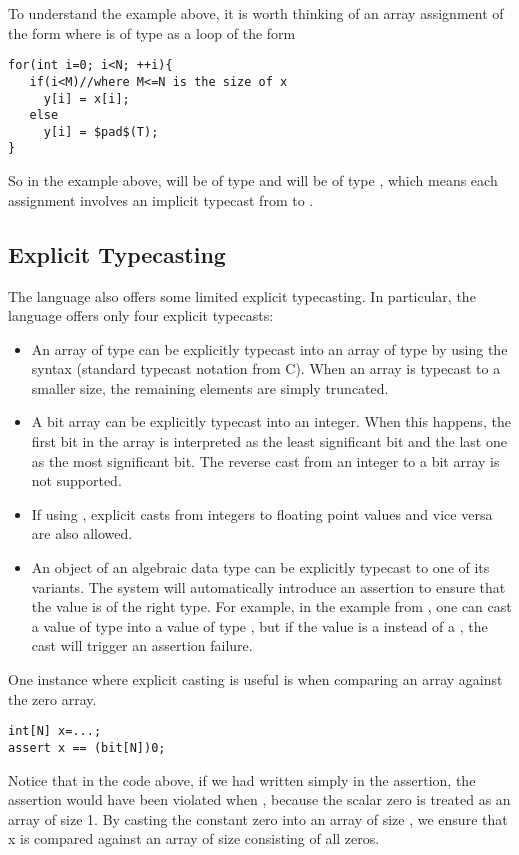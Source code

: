 To understand the example above, it is worth thinking of an array assignment of the form  where  is of type  as a loop of the form 
\begin{lstlisting}
for(int i=0; i<N; ++i){
   if(i<M)//where M<=N is the size of x
     y[i] = x[i];
   else
     y[i] = $pad$(T);
}
\end{lstlisting}
So in the example above,  will be of type  and  will be of type , which means each assignment involves an implicit typecast from  to .


\subsection{Explicit Typecasting}
The \Sk{} language also offers some limited explicit typecasting. In particular, the language offers only four explicit typecasts:
\begin{itemize}

\item An array  of type  can be explicitly typecast into an array of type  by using the syntax  (standard typecast notation from C). When an array is typecast to a smaller size, the remaining elements are simply truncated. 

\item A bit array  can be explicitly typecast into an integer. When this happens, the first bit in the array is interpreted as the least significant bit and the last one as the most significant bit. The reverse cast from an integer to a bit array is not supported.

\item If using , explicit casts from integers to floating point values and vice versa are also allowed.
\item An object of an algebraic data type can be explicitly typecast to one of its variants. The system will automatically introduce an assertion to ensure that the value is of the right type. For example, in the  example from , one can cast a value of type  into a value of type , but if the value is a  instead of a , the cast will trigger an assertion failure.
\end{itemize}

\begin{Example}
One instance where explicit casting is useful is when comparing an array against the zero array.
\begin{lstlisting}
int[N] x=...;
assert x == (bit[N])0;
\end{lstlisting}
Notice that in the code above, if we had written simply  in the assertion, the assertion would have been violated when , because the scalar zero is treated as an array of size 1. By casting the constant zero into an array of size , we ensure that x is compared against an array of size  consisting of all zeros.
\end{Example}

